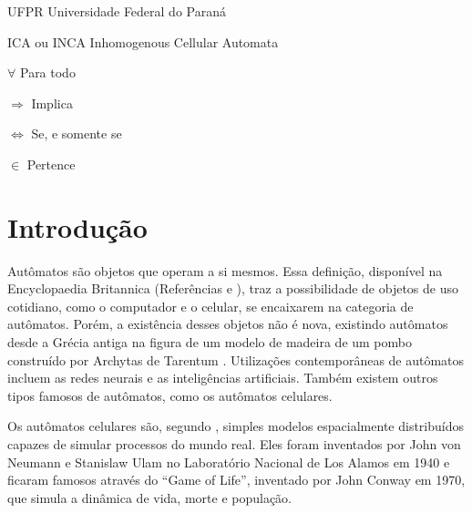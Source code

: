 \documentclass[
	12pt,				%
	openright,			%
	twoside,			%
	a4paper,			%
	english,			%
	french,				%
	spanish,			%
	brazil				%
	]{abntex2}
\begin{document}
\begin{siglas}
  \item[UFPR] Universidade Federal do Paraná
  \item[ICA ou INCA] Inhomogenous Cellular Automata
\end{siglas}

\begin{simbolos}
  \item[$ \forall $] Para todo
  \item[$ \Rightarrow $] Implica
  \item[$ \Leftrightarrow $] Se, e somente se
  \item[$ \in $] Pertence
\end{simbolos}

\tableofcontents*
\cleardoublepage



\textual

\chapter{Introdução}

Autômatos são objetos que operam a si mesmos. Essa definição, disponível na Encyclopaedia Britannica (Referências \cite{britannica1} e \cite{britannica2}), traz a possibilidade de objetos de uso cotidiano, como o computador e o celular, se encaixarem na categoria de autômatos. Porém, a existência desses objetos não é nova, existindo autômatos desde a Grécia antiga na figura de um modelo de madeira de um pombo construído por Archytas de Tarentum \cite{britannica1}. Utilizações contemporâneas de autômatos incluem as redes neurais e as inteligências artificiais. Também existem outros tipos famosos de autômatos, como os autômatos celulares.

Os autômatos celulares são, segundo , simples modelos espacialmente distribuídos capazes de simular processos do mundo real. Eles foram inventados por John von Neumann e Stanislaw Ulam no Laboratório Nacional de Los Alamos em 1940 e ficaram famosos através do ``Game of Life'', inventado por John Conway em 1970, que simula a dinâmica de vida, morte e população.
\end{document}
